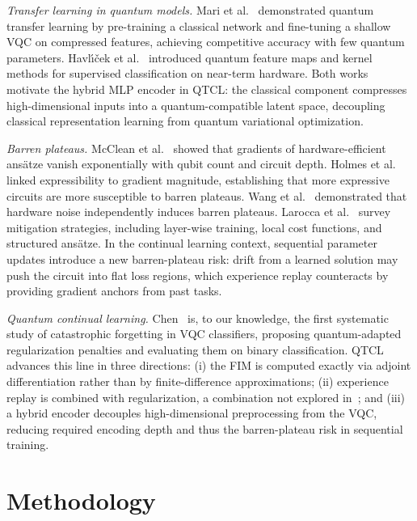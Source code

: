 \documentclass{llncs}
\begin{document}
\noindent\textit{Transfer learning in quantum models.}
Mari et al.~\cite{mari2020transfer} demonstrated quantum transfer learning by
pre-training a classical network and fine-tuning a shallow VQC on compressed
features, achieving competitive accuracy with few quantum parameters.
Havl{\'\i}{\v{c}}ek et al.~\cite{havlicek2019supervised} introduced quantum
feature maps and kernel methods for supervised classification on near-term
hardware.
Both works motivate the hybrid MLP encoder in QTCL: the classical component
compresses high-dimensional inputs into a quantum-compatible latent space,
decoupling classical representation learning from quantum variational optimization.

\noindent\textit{Barren plateaus.}
McClean et al.~\cite{mcclean2018barren} showed that gradients of hardware-efficient
ansätze vanish exponentially with qubit count and circuit depth.
Holmes et al.~\cite{holmes2022connecting} linked expressibility to gradient
magnitude, establishing that more expressive circuits are more susceptible to
barren plateaus.
Wang et al.~\cite{wang2021noise} demonstrated that hardware noise independently
induces barren plateaus.
Larocca et al.~\cite{larocca2024review} survey mitigation strategies, including
layer-wise training, local cost functions, and structured ansätze.
In the continual learning context, sequential parameter updates introduce a
new barren-plateau risk: drift from a learned solution may push the circuit
into flat loss regions, which experience replay counteracts by providing
gradient anchors from past tasks.

\noindent\textit{Quantum continual learning.}
Chen~\cite{chen2022quantumcl} is, to our knowledge, the first systematic study
of catastrophic forgetting in VQC classifiers, proposing quantum-adapted
regularization penalties and evaluating them on binary classification.
QTCL advances this line in three directions: (i) the FIM is computed exactly
via adjoint differentiation rather than by finite-difference approximations;
(ii) experience replay is combined with regularization, a combination not
explored in~\cite{chen2022quantumcl}; and (iii) a hybrid encoder decouples
high-dimensional preprocessing from the VQC, reducing required encoding depth
and thus the barren-plateau risk in sequential training.

\section{Methodology}
\label{sec:method}
\end{document}
